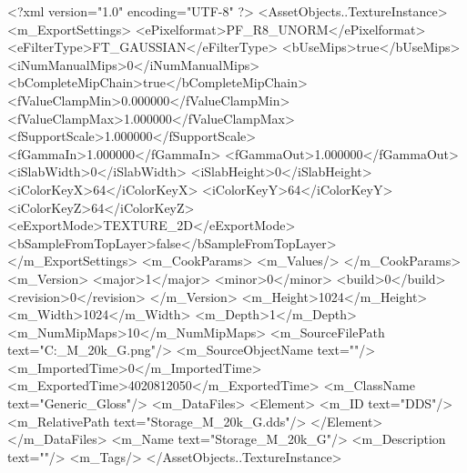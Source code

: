 <?xml version="1.0" encoding="UTF-8" ?>
<AssetObjects..TextureInstance>
	<m_ExportSettings>
		<ePixelformat>PF_R8_UNORM</ePixelformat>
		<eFilterType>FT_GAUSSIAN</eFilterType>
		<bUseMips>true</bUseMips>
		<iNumManualMips>0</iNumManualMips>
		<bCompleteMipChain>true</bCompleteMipChain>
		<fValueClampMin>0.000000</fValueClampMin>
		<fValueClampMax>1.000000</fValueClampMax>
		<fSupportScale>1.000000</fSupportScale>
		<fGammaIn>1.000000</fGammaIn>
		<fGammaOut>1.000000</fGammaOut>
		<iSlabWidth>0</iSlabWidth>
		<iSlabHeight>0</iSlabHeight>
		<iColorKeyX>64</iColorKeyX>
		<iColorKeyY>64</iColorKeyY>
		<iColorKeyZ>64</iColorKeyZ>
		<eExportMode>TEXTURE_2D</eExportMode>
		<bSampleFromTopLayer>false</bSampleFromTopLayer>
	</m_ExportSettings>
	<m_CookParams>
		<m_Values/>
	</m_CookParams>
	<m_Version>
		<major>1</major>
		<minor>0</minor>
		<build>0</build>
		<revision>0</revision>
	</m_Version>
	<m_Height>1024</m_Height>
	<m_Width>1024</m_Width>
	<m_Depth>1</m_Depth>
	<m_NumMipMaps>10</m_NumMipMaps>
	<m_SourceFilePath text="C:\Users\Shadow\Desktop\Prototypes\Storage_M_20k_G.png"/>
	<m_SourceObjectName text=""/>
	<m_ImportedTime>0</m_ImportedTime>
	<m_ExportedTime>4020812050</m_ExportedTime>
	<m_ClassName text="Generic_Gloss"/>
	<m_DataFiles>
		<Element>
			<m_ID text="DDS"/>
			<m_RelativePath text="Storage_M_20k_G.dds"/>
		</Element>
	</m_DataFiles>
	<m_Name text="Storage_M_20k_G"/>
	<m_Description text=""/>
	<m_Tags/>
</AssetObjects..TextureInstance>

